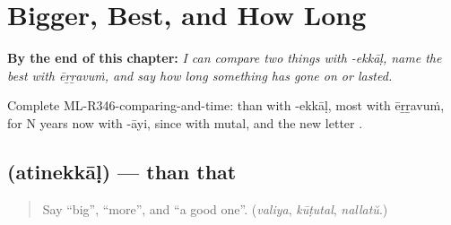 
\chapter{Bigger, Best, and How Long}
\label{ch:ml-bigger-best-and-how-long}

\begin{chapteropening}
\textbf{By the end of this chapter:} \emph{I can compare two things with -ekkāḷ, name the best with ēṟṟavuṁ, and say how long something has gone on or lasted.}

Complete ML-R346-comparing-and-time: than with -ekkāḷ, most with ēṟṟavuṁ, for N years now with -āyi, since with mutal, and the new letter .
\end{chapteropening}

\section[\texorpdfstring{\ml{അതിനെക്കാൾ} (atinekkāḷ)}{അതിനെക്കാൾ (atinekkāḷ)}]{ (atinekkāḷ) — than that}

\label{lesson:ML-C346-atinekkal}



\begin{quote}
Say \textquotedblleft{}big\textquotedblright{}, \textquotedblleft{}more\textquotedblright{}, and \textquotedblleft{}a good one\textquotedblright{}. (\emph{valiya}, \emph{kūṭutal}, \emph{nallatŭ}.)
\end{quote}

